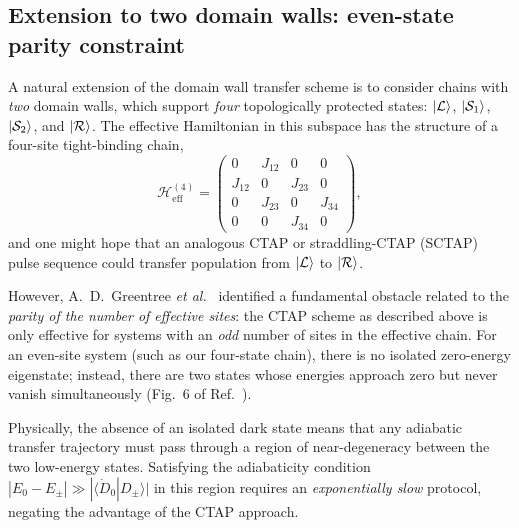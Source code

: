 \documentclass[
  reprint,
  amsmath,
  amssymb,
  aps,
  prb,
  floatfix,
  longbibliography,
]{revtex4-2}
\newcommand{\Heff}{\mathcal{H}_{\mathrm{eff}}}
\newcommand{\ketL}{\ket{\mathcal{L}}}
\newcommand{\ketR}{\ket{\mathcal{R}}}
\begin{document}
\subsection{Extension to two domain walls: even-state parity constraint}
\label{sec:ctap_twodw}

A natural extension of the domain wall transfer scheme is to consider chains
with \emph{two} domain walls, which support \emph{four} topologically
protected states: $\ketL$, $\ket{\mathcal{S}_1}$, $\ket{\mathcal{S}_2}$, and
$\ketR$. The effective Hamiltonian in this subspace has the structure of a
four-site tight-binding chain,
\begin{equation}
  \Heff^{(4)} =
  \begin{pmatrix}
    0 & J_{12} & 0 & 0 \\
    J_{12} & 0 & J_{23} & 0 \\
    0 & J_{23} & 0 & J_{34} \\
    0 & 0 & J_{34} & 0
  \end{pmatrix},
  \label{eq:heff_4}
\end{equation}
and one might hope that an analogous CTAP or straddling-CTAP (SCTAP)
pulse sequence could transfer population from $\ketL$ to $\ketR$.

However, A.~D.~Greentree \textit{et al.}~\cite{Greentree2004} identified a
fundamental obstacle related to the \emph{parity of the number of effective
sites}: the CTAP scheme as described above is only effective for systems with
an \emph{odd} number of sites in the effective chain. For an even-site system
(such as our four-state chain), there is no isolated zero-energy eigenstate;
instead, there are two states whose energies approach zero but never vanish
simultaneously (Fig.~6 of Ref.~\cite{Greentree2004}).

Physically, the absence of an isolated dark state means that any adiabatic
transfer trajectory must pass through a region of near-degeneracy between the
two low-energy states. Satisfying the adiabaticity condition
$|E_0 - E_\pm| \gg |\langle\dot{D}_0|D_\pm\rangle|$ in this region requires
an \emph{exponentially slow} protocol, negating the advantage of the CTAP
approach.
\end{document}
